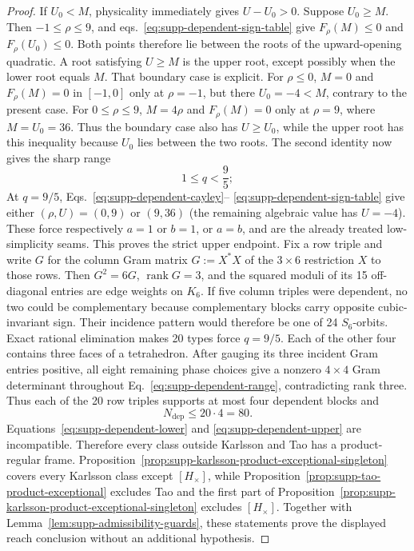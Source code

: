\documentclass[aps,prx,reprint,nofootinbib,twoside,superscriptaddress,longbibliography,floatfix]{revtex4-2}
\theoremstyle{definition}
\begin{document}
\begin{proof}
If $U_0<M$, physicality immediately gives $U-U_0>0$. Suppose $U_0\geq M$. Then $-1\leq\rho\leq9$, and eqs.~\eqref{eq:supp-dependent-sign-table} give $F_\rho(M)\leq0$ and $F_\rho(U_0)\leq0$. Both points therefore lie between the roots of the upward-opening quadratic.  A root satisfying $U\geq M$ is the upper root, except possibly when the lower root equals $M$.  That boundary case is explicit.  For $\rho\leq0$, $M=0$ and $F_\rho(M)=0$ in $[-1,0]$ only at $\rho=-1$, but there $U_0=-4<M$, contrary to the present case. For $0\leq\rho\leq9$, $M=4\rho$ and $F_\rho(M)=0$ only at $\rho=9$, where $M=U_0=36$.  Thus the boundary case also has $U\geq U_0$, while the upper root has this inequality because $U_0$ lies between the two roots. The second identity now gives the sharp range
\begin{equation}
1\le q<\frac95;
\label{eq:supp-dependent-range}
\end{equation}
At $q=9/5$, Eqs.~\eqref{eq:supp-dependent-cayley}-- \eqref{eq:supp-dependent-sign-table} give either $(\rho,U)=(0,9)$ or $(9,36)$ (the remaining algebraic value has $U=-4$).  These force respectively $a=1$ or $b=1$, or $a=b$, and are the already treated low-simplicity seams.  This proves the strict upper endpoint. Fix a row triple and write $G$ for the column Gram matrix $G:=X^*X$ of the $3\times6$ restriction $X$ to those rows. Then $G^2=6G$, $\operatorname{rank}G=3$, and the squared moduli of its 15 off-diagonal entries are edge weights on $K_6$. If five column triples were dependent, no two could be complementary because complementary blocks carry opposite cubic-invariant sign. Their incidence pattern would therefore be one of 24 $S_6$-orbits. Exact rational elimination makes 20 types force $q=9/5$.  Each of the other four contains three faces of a tetrahedron. After gauging its three incident Gram entries positive, all eight remaining phase choices give a nonzero $4\times4$ Gram determinant throughout Eq.~\eqref{eq:supp-dependent-range}, contradicting rank three.  Thus each of the 20 row triples supports at most four dependent blocks and
\begin{equation}
N_{\mathrm{dep}}\le20\cdot4=80.
\label{eq:supp-dependent-upper}
\end{equation}
Equations~\eqref{eq:supp-dependent-lower} and \eqref{eq:supp-dependent-upper} are incompatible. Therefore every class outside Karlsson and Tao has a product-regular frame. Proposition~\ref{prop:supp-karlsson-product-exceptional-singleton} covers every Karlsson class except $[H_\times]$, while Proposition~\ref{prop:supp-tao-product-exceptional} excludes Tao and the first part of Proposition~\ref{prop:supp-karlsson-product-exceptional-singleton} excludes $[H_\times]$. {Together with Lemma~\ref{lem:supp-admissibility-guards}, these statements prove the displayed reach conclusion without an additional hypothesis.}
\end{proof}
\end{document}
